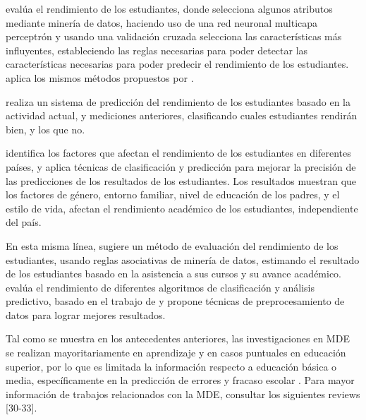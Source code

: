 \cite{borkar2014attributes} evalúa el rendimiento de los estudiantes, donde selecciona algunos atributos mediante minería de datos, haciendo uso de una red neuronal multicapa perceptrón y usando una validación cruzada selecciona las características más influyentes, estableciendo las reglas necesarias para poder detectar las características necesarias para poder predecir el rendimiento de los estudiantes. \cite{jayakameswaraiah2014study} aplica los mismos métodos propuestos por \cite{borkar2014attributes}.

\cite{abdullah2014students} realiza un sistema de predicción del rendimiento de los estudiantes basado en la actividad actual, y mediciones anteriores, clasificando cuales estudiantes rendirán bien, y los que no. 

\cite{oskouei2014predicting} identifica los factores que afectan el rendimiento de los estudiantes en diferentes países, y aplica técnicas de clasificación y predicción para mejorar la precisión de las predicciones de los resultados de los estudiantes. Los resultados muestran que los factores de género, entorno familiar, nivel de educación de los padres, y el estilo de vida, afectan el rendimiento académico de los estudiantes, independiente del país.

En esta misma línea, \cite{borkar2013predicting} sugiere un método de evaluación del rendimiento de los estudiantes, usando reglas asociativas de minería de datos, estimando el resultado de los estudiantes basado en la asistencia a sus cursos y su avance académico. \cite{shazmeen2013performance} evalúa el rendimiento de diferentes algoritmos de clasificación y análisis predictivo, basado en el trabajo de \cite{borkar2013predicting} y propone técnicas de preprocesamiento de datos para lograr mejores resultados. 

Tal como se muestra en los antecedentes anteriores, las investigaciones en MDE se realizan mayoritariamente en aprendizaje  y en casos puntuales en educación superior, por lo que es limitada la información respecto a educación básica o media, específicamente en la predicción de errores y fracaso escolar \parencite{marquez2013predicting}. Para mayor información de trabajos relacionados con la MDE, consultar los siguientes reviews [30-33]. 
